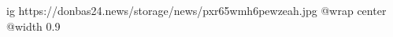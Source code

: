  
 
 
 
 

\ifcmt
  ig https://donbas24.news/storage/news/pxr65wmh6pewzeah.jpg
  @wrap center
  @width 0.9
\fi
